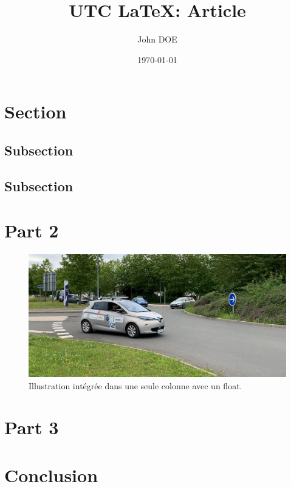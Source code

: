 \documentclass[a4paper,12pt]{article}
\title{UTC \LaTeX : Article}
\author{John DOE}
\date{\today}
\begin{document}
\articletitle

\begin{multicols}{2}

\section{Section}
\subsection{Subsection}
\lipsum[1][1]
\lipsum[1][2]
\lipsum[1][3]

\subsection{Subsection}
\lipsum[1][4]
\lipsum[1][5]
\lipsum[1][6]
\lipsum[1][7]

\section{Part 2}
\lipsum[2][1]

\begin{figure}[H]
\centering
\includegraphics[width=\linewidth]{img/zoe_hds.jpg}
\caption{Illustration intégrée dans une seule colonne avec un float.}
\end{figure}

\lipsum[2][2]
\lipsum[2][3]
\lipsum[2][4]

\section{Part 3}
\lipsum[3]

\section{Conclusion}
\lipsum[4]

\end{multicols}
\end{document}
